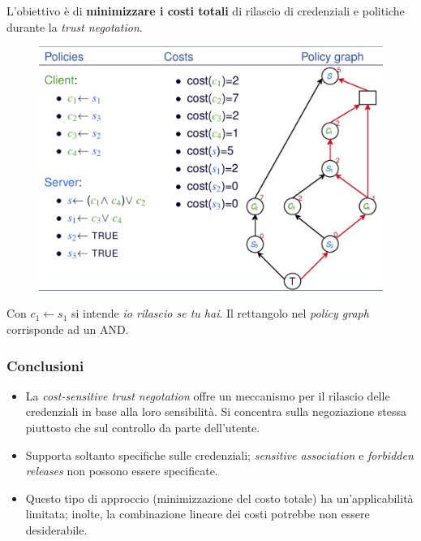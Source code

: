 \documentclass{report}
\begin{document}
\noindent L'obiettivo è di \textbf{minimizzare i costi totali} di rilascio di credenziali 
e politiche durante la \textit{trust negotation}.

\begin{figure}[ht]
    \centering
    \includegraphics[width=0.83\linewidth]{images/cost-sensitive.png}
\end{figure}

Con $c_1 \leftarrow s_1$ si intende \textit{io rilascio se tu hai}. Il rettangolo nel 
\textit{policy graph} corrisponde ad un AND.

\subsubsection{Conclusioni}

\begin{itemize}
    \item La \textit{cost-sensitive trust negotation} offre un meccanismo per il rilascio delle credenziali 
    in base alla loro sensibilità. Si concentra sulla negoziazione stessa piuttosto che 
    sul controllo da parte dell'utente.
    \item Supporta soltanto specifiche sulle credenziali; \textit{sensitive association} e \textit{forbidden releases} 
    non possono essere specificate.
    \item Questo tipo di approccio (minimizzazione del costo totale) ha un'applicabilità limitata;
    inolte, la combinazione lineare dei costi potrebbe non essere desiderabile.
\end{itemize}
\end{document}
